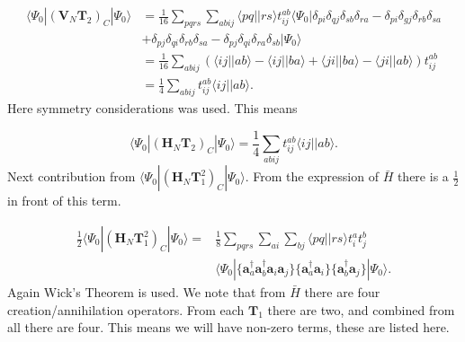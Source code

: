 \documentclass[a4paper,norsk,11pt,twoside]{report}
\begin{document}
\begin{align}
\langle \Psi_0 | (\textbf{V}_N \textbf{T}_2)_C | \Psi_0 \rangle & =  \frac{1}{16} \sum_{pqrs} \sum_{abij}  \langle pq||rs \rangle t_{ij}^{ab} \langle \Psi_0|
\delta_{pi} \delta_{qj} \delta_{sb} \delta_{ra} 
- \delta_{pi} \delta_{gj} \delta_{rb} \delta_{sa}\nonumber \\ & 
+ \delta_{pj} \delta_{qi} \delta_{rb} \delta_{sa}
- \delta_{pj} \delta_{qi} \delta_{ra} \delta_{sb}
| \Psi_0 \rangle \nonumber \\ &
= \frac{1}{16} \sum_{abij} ( 
\langle ij || ab \rangle
- \langle ij || ba \rangle
+ \langle ji || ba \rangle
- \langle ji || ab \rangle ) t_{ij}^{ab} \nonumber \\ &
= \frac{1}{4} \sum_{abij} t_{ij}^{ab} \langle ij||ab \rangle .
\end{align}
Here symmetry considerations was used. This means 

\begin{equation}
\langle \Psi_0 | (\textbf{H}_N \textbf{T}_2)_C | \Psi_0 \rangle = \frac{1}{4} \sum_{abij} t_{ij}^{ab} \langle ij||ab \rangle . \label{Energy_Contribution_2}
\end{equation}
Next contribution from $\langle \Psi_0 | (\textbf{H}_N \textbf{T}_1^2)_C | \Psi_0 \rangle$. From the expression of $\bar{H}$ there is a $\frac{1}{2}$ in front of this term.

\begin{align}
\frac{1}{2} \langle \Psi_0 | (\textbf{H}_N \textbf{T}_1^2)_C | \Psi_0 \rangle = & \frac{1}{8} \sum_{pqrs} \sum_{ai} \sum_{bj} \langle pq || rs \rangle t_i^a t_j^b \nonumber \\ & 
\langle \Psi_0| 
 \{\textbf{a}^{\dag}_a \textbf{a}^{\dag}_b \textbf{a}_i \textbf{a}_j \}
\{\textbf{a}^{\dag}_a \textbf{a}_i \}
\{\textbf{a}^{\dag}_b \textbf{a}_j \}
| \Psi_0 \rangle .
\end{align}
Again Wick's Theorem is used. We note that from $\bar{H}$ there are four creation/annihilation operators. From each $\textbf{T}_1$ there are two, and combined from all there are four. This means we will have non-zero terms, these are listed here.
\end{document}
